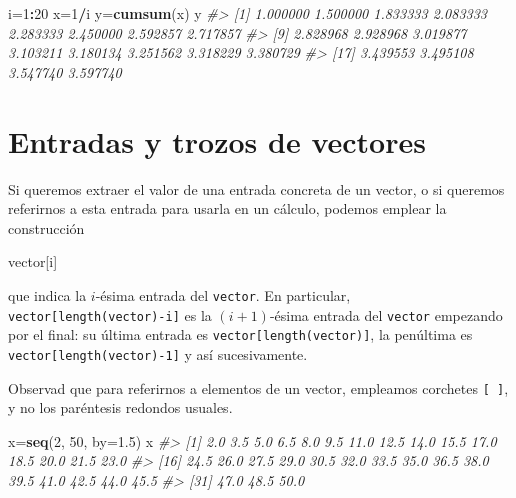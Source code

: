 \documentclass[
]{book}
\newenvironment{Shaded}{\begin{snugshade}}{\end{snugshade}}
\newcommand{\CommentTok}[1]{\textcolor[rgb]{0.56,0.35,0.01}{\textit{#1}}}
\newcommand{\DataTypeTok}[1]{\textcolor[rgb]{0.13,0.29,0.53}{#1}}
\newcommand{\DecValTok}[1]{\textcolor[rgb]{0.00,0.00,0.81}{#1}}
\newcommand{\FloatTok}[1]{\textcolor[rgb]{0.00,0.00,0.81}{#1}}
\newcommand{\KeywordTok}[1]{\textcolor[rgb]{0.13,0.29,0.53}{\textbf{#1}}}
\newcommand{\NormalTok}[1]{#1}
\newcommand{\OperatorTok}[1]{\textcolor[rgb]{0.81,0.36,0.00}{\textbf{#1}}}
\theoremstyle{definition}
\theoremstyle{definition}
\theoremstyle{definition}
\theoremstyle{remark}
\begin{document}
\begin{Shaded}
\begin{Highlighting}[]
\NormalTok{i=}\DecValTok{1}\OperatorTok{:}\DecValTok{20}
\NormalTok{x=}\DecValTok{1}\OperatorTok{/}\NormalTok{i}
\NormalTok{y=}\KeywordTok{cumsum}\NormalTok{(x)}
\NormalTok{y}
\CommentTok{\#\textgreater{}  [1] 1.000000 1.500000 1.833333 2.083333 2.283333 2.450000 2.592857 2.717857}
\CommentTok{\#\textgreater{}  [9] 2.828968 2.928968 3.019877 3.103211 3.180134 3.251562 3.318229 3.380729}
\CommentTok{\#\textgreater{} [17] 3.439553 3.495108 3.547740 3.597740}
\end{Highlighting}
\end{Shaded}

\hypertarget{entradas-y-trozos-de-vectores}{%
\section{Entradas y trozos de vectores}\label{entradas-y-trozos-de-vectores}}

Si queremos extraer el valor de una entrada concreta de un vector, o si queremos referirnos a esta entrada para usarla en un cálculo, podemos emplear la construcción

\begin{Shaded}
\begin{Highlighting}[]
\NormalTok{vector[i]}
\end{Highlighting}
\end{Shaded}

que indica la \(i\)-ésima entrada del \texttt{vector}. En particular, \texttt{vector{[}length(vector)-i{]}} es la \((i+1)\)-ésima entrada del \texttt{vector} empezando por el final: su última entrada es \texttt{vector{[}length(vector){]}}, la penúltima es \texttt{vector{[}length(vector)-1{]}} y así sucesivamente.

Observad que para referirnos a elementos de un vector, empleamos corchetes \texttt{{[}\ {]}}, y no los paréntesis redondos usuales.

\begin{Shaded}
\begin{Highlighting}[]
\NormalTok{x=}\KeywordTok{seq}\NormalTok{(}\DecValTok{2}\NormalTok{, }\DecValTok{50}\NormalTok{, }\DataTypeTok{by=}\FloatTok{1.5}\NormalTok{)}
\NormalTok{x}
\CommentTok{\#\textgreater{}  [1]  2.0  3.5  5.0  6.5  8.0  9.5 11.0 12.5 14.0 15.5 17.0 18.5 20.0 21.5 23.0}
\CommentTok{\#\textgreater{} [16] 24.5 26.0 27.5 29.0 30.5 32.0 33.5 35.0 36.5 38.0 39.5 41.0 42.5 44.0 45.5}
\CommentTok{\#\textgreater{} [31] 47.0 48.5 50.0}
\end{Highlighting}
\end{Shaded}
\end{document}
